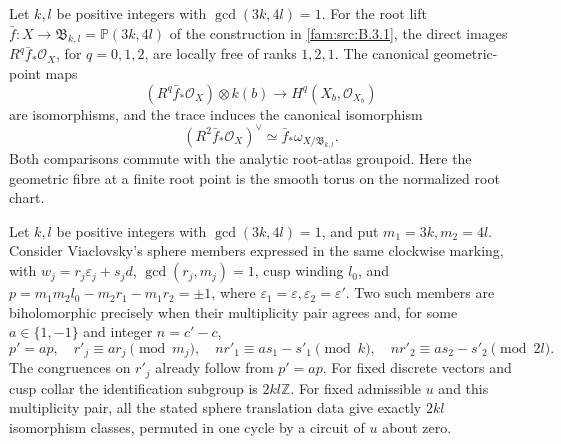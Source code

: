 
\begin{proposition}\hypertarget{tag-033I}{}\label{push:src:E.3.1}


Let $k,l$ be positive integers with $\gcd(3k,4l)=1$.
For the root lift $\bar f:X\to\mathfrak B_{k,l}=\mathbb P(3k,4l)$
of the construction in \cref{fam:src:B.3.1}, the direct images
$R^q\bar f_*\mathcal O_X$, for $q=0,1,2$, are locally free of
ranks $1,2,1$. The canonical geometric-point maps
\[
 (R^q\bar f_*\mathcal O_X)\otimes k(b)
 \longrightarrow H^q(X_b,\mathcal O_{X_b})
\]
are isomorphisms, and the trace induces the canonical isomorphism
\[
 (R^2\bar f_*\mathcal O_X)^\vee
 \simeq\bar f_*\omega_{X/\mathfrak B_{k,l}}.
\]
Both comparisons commute with the analytic root-atlas groupoid.
Here the geometric fibre at a finite root point is the smooth torus
on the normalized root chart.
\end{proposition}

\begin{proposition}\hypertarget{tag-01QE}{}\label{fam:src:B.3.1}\label{fam:st:B.3.1}


Let $k,l$ be positive integers with $\gcd(3k,4l)=1$, and put $m_1=3k,m_2=4l$. Consider Viaclovsky's sphere members expressed in the same clockwise marking, with $w_j=r_j\varepsilon_j+s_jd$, $\gcd(r_j,m_j)=1$, cusp winding $l_0$, and $p=m_1m_2l_0-m_2r_1-m_1r_2=\pm1$, where $\varepsilon_1=\varepsilon,\varepsilon_2=\varepsilon'$. Two such members are biholomorphic precisely when their multiplicity pair agrees and, for some $a\in\{1,-1\}$ and integer $n=c'-c$,
\[
 p'=ap,\quad r'_j\equiv ar_j\pmod{m_j},\quad
 nr'_1\equiv as_1-s'_1\pmod{k},\quad
 nr'_2\equiv as_2-s'_2\pmod{2l}.
\]
The congruences on $r'_j$ already follow from $p'=ap$. For fixed discrete vectors and cusp collar the identification subgroup is $2kl\mathbb Z$. For fixed admissible $u$ and this multiplicity pair, all the stated sphere translation data give exactly $2kl$ isomorphism classes, permuted in one cycle by a circuit of $u$ about zero.
\end{proposition}


